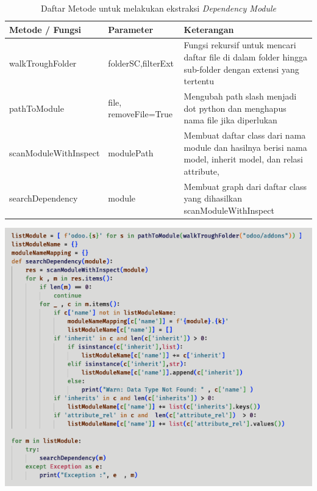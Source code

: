 \begingroup
\setlength{\LTleft}{-20cm plus -1fill}
\setlength{\LTright}{\LTleft} %
\begin{small}
	\begin{longtable}{|p{4cm}|p{3cm}|p{6cm}|}
		\caption{Daftar Metode untuk melakukan ekstraksi \textit{Dependency Module} }\\
		\hline
		\textbf{Metode / Fungsi} & \textbf{Parameter} & \textbf{Keterangan}\\
		\endfirsthead
		
		\hline  

		walkTroughFolder
		& folderSC,filterExt
		 & Fungsi rekursif untuk mencari daftar file di dalam folder hingga sub-folder dengan extensi yang tertentu  \\

		 \hline  
		
		 pathToModule
		& file, removeFile=True
		 &  Mengubah path slash menjadi dot python dan menghapus nama file jika diperlukan \\
		
		 \hline

		scanModuleWithInspect
		& modulePath
		 &  Membuat daftar class dari nama module dan hasilnya berisi nama model, inherit model, dan relasi attribute,  \\
		\hline  

		searchDependency
		& module
		 & Membuat graph dari daftar class yang dihasilkan scanModuleWithInspect \\
		\hline  

	\end{longtable}
\end{small}
\endgroup

\begin{center}
	\includegraphics[width=14cm]{img/bab_4/def_inspect_1.png}
	\label{fig:def_inspect_1}
\end{center}


